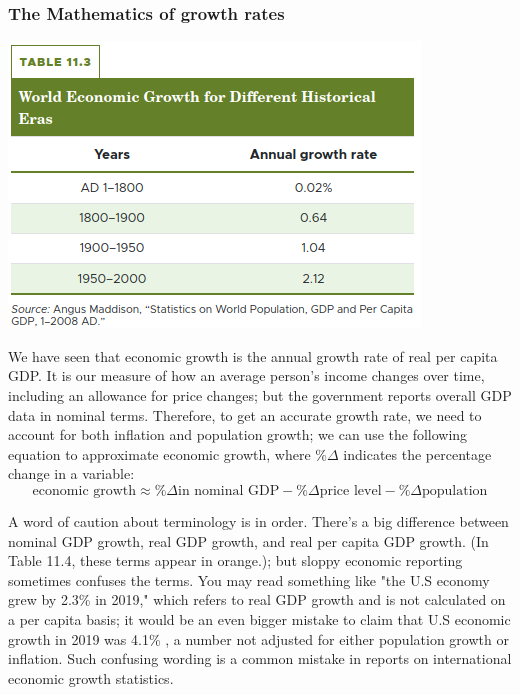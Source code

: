 \documentclass[11pt]{article} %
\begin{document}
\subsubsection*{The Mathematics of growth rates}

\begin{center}
\includegraphics[scale=0.5]{../../images/Chapter 11/table 11.3 .png}
\end{center}

We have seen that economic growth is the annual growth rate of real per capita GDP. It is our measure of how an average person's income changes over time, including an allowance for price changes; but the government reports overall GDP data in nominal terms. Therefore, to get an accurate growth rate, we need to account for both inflation and population growth; we can use the following equation to approximate economic growth, where \(\% \Delta\) indicates the percentage change in a variable:
\begin{equation}
\text{economic growth} \approx \% \Delta \text{in nominal GDP}-\% \Delta \text{price level} - \% \Delta \text{population}
\end{equation}

A word of caution about terminology is in order. There's a big difference between nominal GDP growth, real GDP growth, and real per capita GDP growth. (In Table 11.4, these terms appear in orange.); but sloppy economic reporting sometimes confuses the terms. You may read something like "the U.S economy grew by 2.3\% in 2019," which refers to real GDP growth and is not calculated on a per capita basis; it would be an even bigger mistake to claim that U.S economic growth in 2019 was 4.1\% , a number not adjusted for either population growth or inflation. Such confusing wording is a common mistake in reports on international economic growth statistics.
\end{document}
